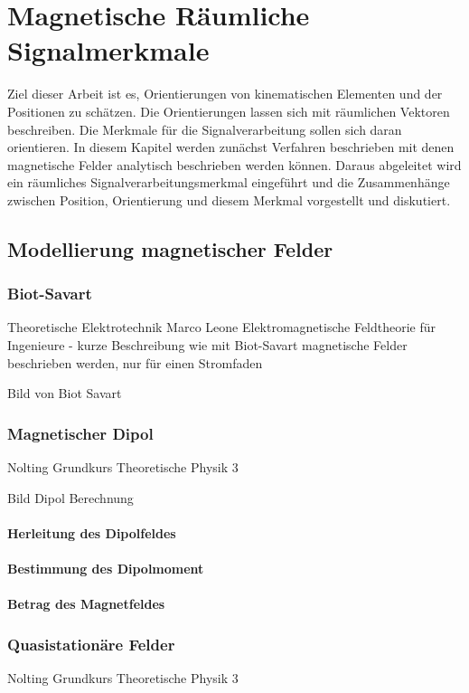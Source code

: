 \chapter{Magnetische Räumliche Signalmerkmale}
\label{chap:raeumliches_merkmal} 
Ziel dieser Arbeit ist es, Orientierungen von kinematischen Elementen und der Positionen zu schätzen. Die Orientierungen lassen sich mit räumlichen Vektoren beschreiben. Die Merkmale für die Signalverarbeitung sollen sich daran orientieren. In diesem Kapitel werden zunächst Verfahren beschrieben mit denen magnetische Felder analytisch beschrieben werden können. Daraus abgeleitet wird ein räumliches Signalverarbeitungsmerkmal eingeführt und die Zusammenhänge zwischen Position, Orientierung und diesem Merkmal vorgestellt und diskutiert.

\section{Modellierung magnetischer Felder}

\subsection{Biot-Savart}

Theoretische
Elektrotechnik
Marco Leone
Elektromagnetische Feldtheorie für
Ingenieure
- kurze Beschreibung wie mit Biot-Savart magnetische Felder beschrieben werden, nur für einen Stromfaden 

Bild von Biot Savart

\subsection{Magnetischer Dipol}
Nolting
Grundkurs
Theoretische Physik 3

Bild Dipol Berechnung
\subsubsection{Herleitung des Dipolfeldes}

\subsubsection{Bestimmung des Dipolmoment}
\subsubsection{Betrag des Magnetfeldes}

\subsection{Quasistationäre Felder}
Nolting
Grundkurs
Theoretische Physik 3

